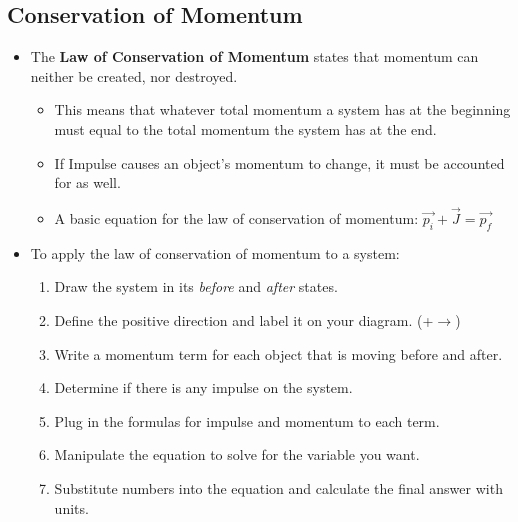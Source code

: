 \documentclass[letterpaper, 12pt]{article}
\begin{document}
\subsection*{Conservation of Momentum}
\begin{itemize}
	\item The \textbf{Law of Conservation of Momentum} states that momentum can neither be created, nor destroyed. 
	\begin{itemize}
		\item This means that whatever total momentum a system has at the beginning must equal to the total momentum the system has at the end. 
		\item If Impulse causes an object's momentum to change, it must be accounted for as well.  
		\item A basic equation for the law of conservation of momentum: $\vec{p_i} + \vec{J} = \vec{p_f} $
	\end{itemize}
	\item To apply the law of conservation of momentum to a system:
		\begin{enumerate}
			\item Draw the system in its \textit{before} and \textit{after} states.  
			\item Define the positive direction and label it on your diagram.  (+$\longrightarrow$)
			\item Write a momentum term for each object that is moving before and after.
			\item Determine if there is any impulse on the system.
			\item Plug in the formulas for impulse and momentum to each term.
			\item Manipulate the equation to solve for the variable you want.
			\item Substitute numbers into the equation and calculate the final answer with units. 
		\end{enumerate}
\end{itemize}

	
\end{document}
